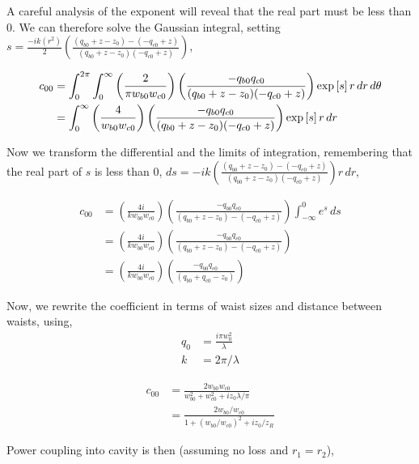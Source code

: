 A careful analysis of the exponent will reveal that the real part must be less than $0$.
We can therefore solve the Gaussian integral, setting $s =
\frac{-ik \left( r^2  \right)}{2} \left( \frac{(q_{b0}+z-z_0)-(-q_{c0}+z)}{(q_{b0}+z-z_0)(-q_{c0}+z)} \right)
$,

\begin{align}
    c_{00} &= \int^{2 \pi}_{0} \int^{\infty}_{0}  \left( \frac{2}{\pi w_{b0} w_{c0}} \right)
    \left( \frac{- q_{b0} q_{c0}}{(q_{b0}+z-z_0)(-q_{c0}+z)} \right)
    \exp \left[ s
    \right] r \,dr \,d\theta \nonumber
\\  &= \int^{\infty}_{0} \left( \frac{4}{w_{b0} w_{c0}} \right)
    \left( \frac{- q_{b0} q_{c0}}{(q_{b0}+z-z_0)(-q_{c0}+z)} \right)
    \exp \left[ s
    \right] r \,dr
\end{align}

Now we transform the differential and the limits of integration, remembering
that the real part of $s$ is less than $0$, $ds =
-ik \left( \frac{(q_{b0}+z-z_0)-(-q_{c0}+z)}{(q_{b0}+z-z_0)(-q_{c0}+z)} \right) r \,dr
$,

\begin{align}
    c_{00} &= \left( \frac{4i}{k w_{b0} w_{c0}} \right)
    \left( \frac{- q_{b0} q_{c0}}{(q_{b0}+z-z_0)-(-q_{c0}+z)} \right)
    \int^{0}_{-\infty} e^s \,ds \nonumber
\\  &= \left( \frac{4i}{k w_{b0} w_{c0}} \right)
    \left( \frac{- q_{b0} q_{c0}}{(q_{b0}+z-z_0)-(-q_{c0}+z)} \right) \nonumber
\\  &= \left( \frac{4i}{k w_{b0} w_{c0}} \right)
    \left( \frac{- q_{b0} q_{c0}}{(q_{b0}+q_{c0}-z_0)} \right)
\end{align}

Now, we rewrite the coefficient in terms of waist sizes and distance between waists, using,
\begin{align*}
    q_0 &= \frac{i \pi w_0^2}{\lambda}
\\  k &= 2 \pi / \lambda
\end{align*}

\begin{align}
    c_{00} &= \frac{2 w_{b0} w_{c0}}{w_{b0}^2 + w_{c0}^2 + i z_0 \lambda / \pi} \nonumber
\\  &= \frac{2 w_{b0} / w_{c0}}{1 + \left( w_{b0} /w_{c0} \right)^2 + i z_0 / z_R}
\end{align}

Power coupling into cavity is then (assuming no loss and $r_1 = r_2$),


